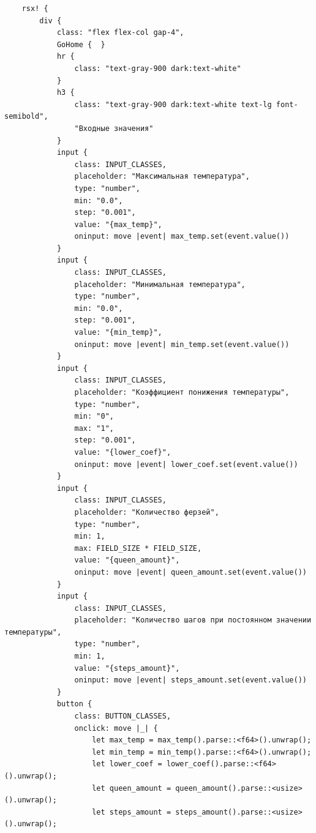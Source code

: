 \documentclass[a4paper,14pt]{extarticle}
\begin{document}
\begin{verbatim}
    rsx! {
        div {
            class: "flex flex-col gap-4",
            GoHome {  }
            hr { 
                class: "text-gray-900 dark:text-white"
            }
            h3 {
                class: "text-gray-900 dark:text-white text-lg font-semibold",
                "Входные значения"
            }
            input { 
                class: INPUT_CLASSES, 
                placeholder: "Максимальная температура",
                type: "number",
                min: "0.0",
                step: "0.001",
                value: "{max_temp}",
                oninput: move |event| max_temp.set(event.value())
            }
            input { 
                class: INPUT_CLASSES, 
                placeholder: "Минимальная температура",
                type: "number",
                min: "0.0",
                step: "0.001",
                value: "{min_temp}",
                oninput: move |event| min_temp.set(event.value())
            }
            input { 
                class: INPUT_CLASSES, 
                placeholder: "Коэффициент понижения температуры",
                type: "number",
                min: "0",
                max: "1",
                step: "0.001",
                value: "{lower_coef}",
                oninput: move |event| lower_coef.set(event.value())
            }
            input { 
                class: INPUT_CLASSES, 
                placeholder: "Количество ферзей",
                type: "number",
                min: 1,
                max: FIELD_SIZE * FIELD_SIZE,
                value: "{queen_amount}",
                oninput: move |event| queen_amount.set(event.value())
            }
            input { 
                class: INPUT_CLASSES, 
                placeholder: "Количество шагов при постоянном значении температуры",
                type: "number",
                min: 1,
                value: "{steps_amount}",
                oninput: move |event| steps_amount.set(event.value())
            }
            button {
                class: BUTTON_CLASSES,
                onclick: move |_| {
                    let max_temp = max_temp().parse::<f64>().unwrap();
                    let min_temp = min_temp().parse::<f64>().unwrap();
                    let lower_coef = lower_coef().parse::<f64>().unwrap();
                    let queen_amount = queen_amount().parse::<usize>().unwrap();
                    let steps_amount = steps_amount().parse::<usize>().unwrap();
                    

\end{verbatim}
\end{document}
